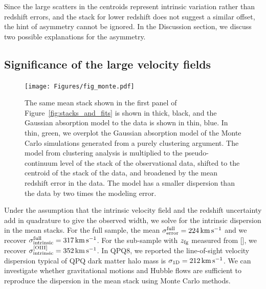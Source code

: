 \documentclass[iop]{emulateapj}
\begin{document}
Since the large scatters in the centroids represent intrinsic variation rather than redshift 
errors, and the  stack for lower redshift does not suggest a similar offset, the hint 
of asymmetry cannot be ignored. In the Discussion section, we discuss two possible explanations 
for the asymmetry. 


\subsection{Significance of the large velocity fields}
\label{sec:significance_width}

\begin{figure}
\texttt{[image: Figures/fig\_monte.pdf]}
\caption{The same  mean stack shown in the first panel of 
Figure~\ref{fig:stacks_and_fits} is shown in thick, black, and the Gaussian absorption model to 
the data is shown in thin, blue. In thin, green, we overplot the Gaussian absorption model of the 
Monte Carlo simulations generated from a purely clustering argument. The model from clustering 
analysis is multiplied to the pseudo-continuum level of the stack of the observational data, 
shifted to the centroid of the stack of the data, and broadened by the mean redshift error in the 
data. The model has a smaller dispersion than the data by two times the modeling error.
}
\label{fig:monte}
\end{figure}

Under the assumption that the intrinsic velocity field and the redshift uncertainty add in 
quadrature to give the observed width, we solve for the intrinsic dispersion in the  
mean stacks. For the full sample, the mean $\sigma_{\rm error}^{\rm full}=224\,{\rm km\,s^{-1}}$ 
and we recover $\sigma_{\rm intrinsic}^{\rm full}=317\,{\rm km\,s^{-1}}$. For the sub-sample with 
$z_{\rm fg}$ measured from [], we recover 
$\sigma_{\rm intrinsic}^{\rm [OIII]}=352\,{\rm km\,s^{-1}}$. In QPQ8, we reported the 
line-of-sight velocity dispersion typical of QPQ dark matter halo mass is 
$\sigma_{\rm 1D}=212\,{\rm km\,s^{-1}}$. We can investigate whether gravitational motions and 
Hubble flows are sufficient to reproduce the dispersion in the  mean stack using Monte 
Carlo methods. 
\end{document}

